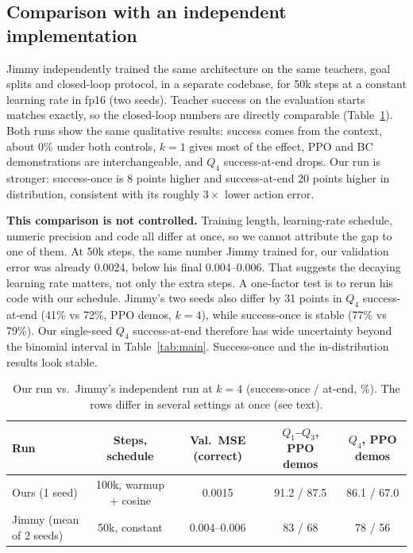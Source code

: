\subsection{Comparison with an independent implementation}
\label{sec:compare}
Jimmy independently trained the same architecture on the same teachers, goal splits and closed-loop protocol, in a separate
codebase, for 50k steps at a constant learning rate in fp16 (two seeds). Teacher success on the evaluation starts matches exactly,
so the closed-loop numbers are directly comparable (Table~\ref{tab:compare}). Both runs show the same qualitative results: success
comes from the context, about 0\% under both controls, $k = 1$ gives most of the effect, PPO and BC demonstrations are
interchangeable, and $Q_4$ success-at-end drops. Our run is stronger: success-once is 8 points higher and success-at-end 20 points
higher in distribution, consistent with its roughly $3\times$ lower action error.

\textbf{This comparison is not controlled.} Training length, learning-rate schedule, numeric precision and code all differ at once,
so we cannot attribute the gap to one of them. At 50k steps, the same number Jimmy trained for, our validation error was already 0.0024, below his
final 0.004--0.006. That suggests the decaying learning rate matters, not only the extra steps. A one-factor test is to rerun his code
with our schedule. Jimmy's two seeds also differ by 31 points in $Q_4$ success-at-end (41\% vs 72\%, PPO demos, $k = 4$), while
success-once is stable (77\% vs 79\%). Our single-seed $Q_4$ success-at-end therefore has wide uncertainty beyond the binomial
interval in Table~\ref{tab:main}. Success-once and the in-distribution results look stable.

\begin{table}[h]
\centering
\caption{Our run vs.\ Jimmy's independent run at $k = 4$ (success-once / at-end, \%). The rows differ in several settings at once
(see text).}
\label{tab:compare}
\small
\begin{tabular}{lcccc}
\toprule
Run & Steps, schedule & Val.\ MSE (correct) & $Q_1$--$Q_3$, PPO demos & $Q_4$, PPO demos \\
\midrule
Ours (1 seed) & 100k, warmup + cosine & 0.0015 & 91.2 / 87.5 & 86.1 / 67.0 \\
Jimmy (mean of 2 seeds) & 50k, constant & 0.004--0.006 & 83 / 68 & 78 / 56 \\
\bottomrule
\end{tabular}
\end{table}

